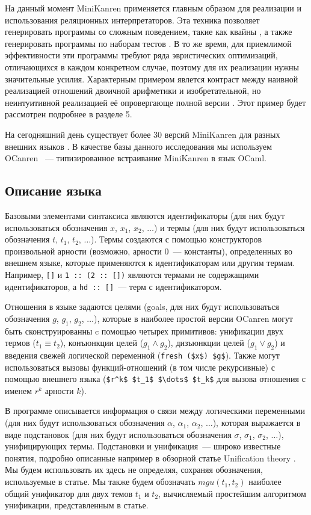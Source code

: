     На данный момент MiniKanren применяется главным образом для реализации и использования реляционных интерпретаторов. Эта техника позволяет генерировать программы со сложным поведением, такие как квайны \cite{Untagged}, а также генерировать программы по наборам тестов \cite{unified}. В то же время, для приемлимой эффективности эти программы требуют ряда эвристических оптимизаций, отличающихся в каждом конкретном случае, поэтому для их реализации нужны значительные усилия. Характерным примером явлется контраст \cite{WillThesis} между наивной реализацией отношений двоичной арифметики и изобретательной, но неинтуитивной реализацией её опровергающе полной версии \cite{KiselyovArithmetic}. Этот пример будет рассмотрен подробнее в разделе 5.

    На сегодняшний день существует более 30 версий MiniKanren для разных внешних языков \cite{MiniKanrenOrg}. В качестве базы данного исследования мы используем OCanren \cite{ocanren}~--- типизированное встраивание MiniKanren в язык OCaml.
    
  \subsection{Описание языка}
    
    Базовыми элементами синтаксиса являются идентификаторы (для них будут использоваться обозначения $x$, $x_1$, $x_2$, $\dots$) и термы (для них будут использоваться обозначения $t$, $t_1$, $t_2$, $\dots$). Термы создаются с помощью конструкторов произвольной арности (возможно, арности 0~--- константы), определенных во внешнем языке, которые применяются к идентификаторам или другим термам. Например, \lstinline|[]| и \lstinline|1 :: (2 :: [])| являются термами не содержащими идентификаторов, а \lstinline|hd :: []|~--- терм с идентификатором.
    
    Отношения в языке задаются целями (goals, для них будут использоваться обозначения $g$, $g_1$, $g_2$, $\dots$), которые в наиболее простой версии OCanren могут быть сконструированны c помощью четырех примитивов: унификации двух термов ($t_1 \equiv t_2$), конъюнкции целей ($g_1 \wedge g_2$), дизъюнкции целей ($g_1 \vee g_2$) и введения свежей логической переменной (\lstinline|fresh ($x$) $g$|). Также могут использоваться вызовы функций-отношений (в том числе рекурсивные) с помощью внешнего языка (\lstinline|$r^k$ $t_1$ $\dots$ $t_k$| для вызова отношения с именем $r^k$ арности $k$).
    
    В программе описывается информация о связи между логическими переменными (для них будут использоваться обозначения $\alpha$, $\alpha_1$, $\alpha_2$, $\dots$), которая выражается в виде подстановок (для них будут использоваться обозначения $\sigma$, $\sigma_1$, $\sigma_2$, $\dots$), унифицирующих термы. Подстановки и унификация~--- широко известные понятия, подробно описанные например в обзорной статье Unification theory \cite{Unification}. Мы будем использовать их здесь не определяя, сохраняя обозначения, используемые в статье. Мы также будем обозначать $mgu(t_1, t_2)$ наиболее общий унификатор для двух темов $t_1$ и $t_2$, вычисляемый простейшим алгоритмом унификации, представленным в статье.
    
